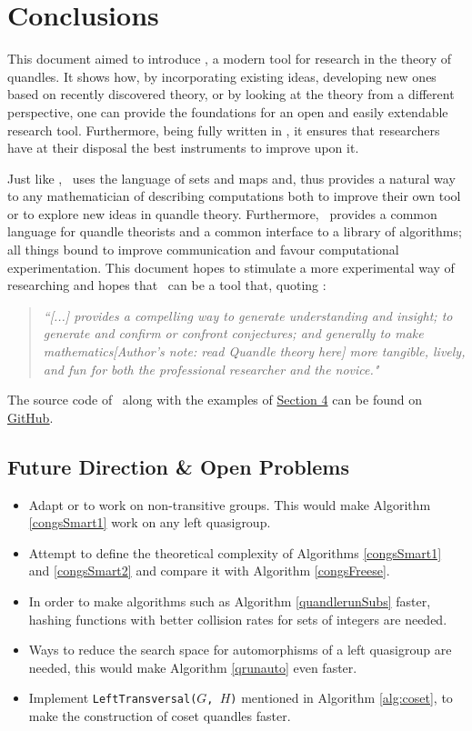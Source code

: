 \chapter{Conclusions}\label{conclusions}
\noindent This document aimed to introduce \Software, a modern tool for research in the theory of quandles. It shows how, by incorporating existing ideas, developing new ones based on recently discovered theory, or by looking at the theory from a different perspective, one can provide the foundations for an open and easily extendable research tool. Furthermore, being fully written in \magma, it ensures that researchers have at their disposal the best instruments to improve upon it.

Just like \magma, \Software~uses the language of sets and maps and, thus provides a natural way to any mathematician of describing computations both to improve their own tool or to explore new ideas in quandle theory. Furthermore, \Software~provides a common language for quandle theorists and a common interface to a library of algorithms; all things bound to improve communication and favour computational experimentation. This document hopes to stimulate a more experimental way of researching and hopes that \Software~can be a tool that, quoting \cite{borwein2004experimentation}:
\begin{quote}
    \emph{``[...] provides a compelling way to generate understanding and insight; to generate and confirm or confront conjectures; and generally to make mathematics[Author's note: read \textit{Quandle theory} here] more tangible, lively, and fun for both the professional researcher and the novice."}
\end{quote}
The source code of \Software~along with the examples of \hyperref[AppSection]{Section 4} can be found on \underline{\href{https://github.com/Ingolfurinn/QuandleRUN-Thesis}{GitHub}}.
\section{Future Direction \& Open Problems}
\begin{itemize}
    \item Adapt \cite{atkinson} or \cite{schonert1994finding} to work on non-transitive groups. This would make Algorithm \ref{congsSmart1} work on any left quasigroup.
    \item Attempt to define the theoretical complexity of Algorithms \ref{congsSmart1} and \ref{congsSmart2} and compare it with Algorithm \ref{congsFreese}.
    \item In order to make algorithms such as Algorithm \ref{quandlerunSubs} faster, hashing functions with better collision rates for sets of integers are needed. 
    \item Ways to reduce the search space for automorphisms of a left quasigroup are needed, this would make Algorithm \ref{qrunauto} even faster.
    \item Implement \texttt{LeftTransversal($G$, $H$)} mentioned in Algorithm \ref{alg:coset}, to make the construction of coset quandles faster. 
\end{itemize}

